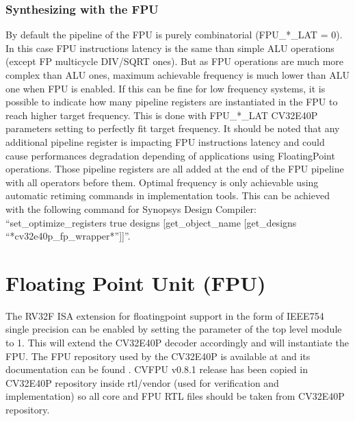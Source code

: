 \documentclass[letterpaper,10pt,english]{sphinxmanual}
\begin{document}
\subsection{Synthesizing with the FPU}
\label{\detokenize{integration:synthesizing-with-the-fpu}}\label{\detokenize{integration:synthesis-with-fpu}}
\sphinxAtStartPar
By default the pipeline of the FPU is purely combinatorial (FPU\_*\_LAT = 0). In this case FPU instructions latency is the same than simple ALU operations (except FP multicycle DIV/SQRT ones).
But as FPU operations are much more complex than ALU ones, maximum achievable frequency is much lower than ALU one when FPU is enabled.
If this can be fine for low frequency systems, it is possible to indicate how many pipeline registers are instantiated in the FPU to reach higher target frequency.
This is done with FPU\_*\_LAT CV32E40P parameters setting to perfectly fit target frequency.
It should be noted that any additional pipeline register is impacting FPU instructions latency and could cause performances degradation depending of applications using Floating\sphinxhyphen{}Point operations.
Those pipeline registers are all added at the end of the FPU pipeline with all operators before them. Optimal frequency is only achievable using automatic retiming commands in implementation tools.
This can be achieved with the following command for Synopsys Design Compiler:
“set\_optimize\_registers true \sphinxhyphen{}designs {[}get\_object\_name {[}get\_designs “*cv32e40p\_fp\_wrapper*”{]}{]}”.

\sphinxstepscope


\chapter{Floating Point Unit (FPU)}
\label{\detokenize{fpu:floating-point-unit-fpu}}\label{\detokenize{fpu:fpu}}\label{\detokenize{fpu::doc}}
\sphinxAtStartPar
The RV32F ISA extension for floating\sphinxhyphen{}point support in the form of IEEE\sphinxhyphen{}754 single
precision can be enabled by setting the parameter  of the  top level module
to 1. This will extend the CV32E40P decoder accordingly and will instantiate the FPU.
The FPU repository used by the CV32E40P is available at  and
its documentation can be found .
CVFPU v0.8.1 release has been copied in CV32E40P repository inside rtl/vendor (used for verification and implementation) so all core and FPU RTL files should be taken from CV32E40P repository.
\end{document}
